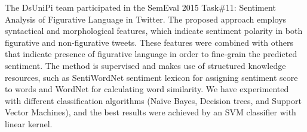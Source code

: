 The DsUniPi team participated in the SemEval 2015 Task\#11: Sentiment Analysis of Figurative Language in Twitter. The proposed approach employs syntactical and morphological features, which indicate sentiment polarity in both figurative and non-figurative tweets. These features were combined with others that indicate presence of figurative language in order to fine-grain the predicted sentiment. The method is supervised and makes use of structured knowledge resources, such as SentiWordNet sentiment lexicon for assigning sentiment score to words and WordNet for calculating word similarity. We have experimented with different classification algorithms (Naïve Bayes, Decision trees, and Support Vector Machines), and the best results were achieved by an SVM classifier with linear kernel.
